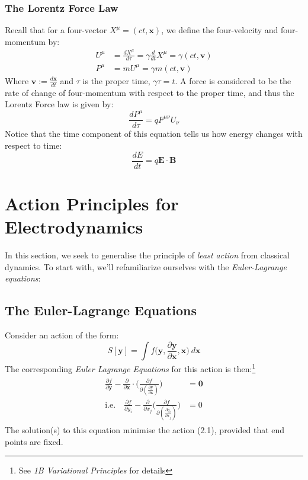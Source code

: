 \documentclass[a4paper]{article}
\numberwithin{equation}{section}
\begin{document}
\subsubsection{The Lorentz Force Law}
Recall that for a four-vector $X^\mu = (ct, \mathbf{x})$, we define the four-velocity and four-momentum by:
\begin{align}
U^\mu&=\frac{dX^\mu}{d \tau}=\gamma\frac{d}{dt}X^\mu=\gamma(ct,\mathbf{v}) \\
P^\mu &= mU^\mu = \gamma m (ct, \mathbf{v})
\end{align}
Where $\mathbf{v}:=\frac{d \mathbf{x}}{dt}$ and $\tau$ is the proper time, $\gamma \tau = t$. A force is considered to be the rate of change of four-momentum with respect to the proper time, and thus the Lorentz Force law is given by:
\begin{equation}
\frac{d P^\mu}{d \tau}=qF^{\mu \nu}U_\nu
\end{equation}
Notice that the time component of this equation tells us how energy changes with respect to time:
\begin{equation}
\frac{d E}{d t}=q \mathbf{E} \cdot \mathbf{B}
\end{equation}

\section{Action Principles for Electrodynamics}
In this section, we seek to generalise the principle of \textit{least action} from classical dynamics. To start with, we'll refamiliarize ourselves with the \textit{Euler-Lagrange equations}:
\subsection{The Euler-Lagrange Equations}
Consider an action of the form:
\begin{equation}
S[\mathbf{y}] = \int f\bigg(\mathbf{y},\frac{\partial \mathbf{y}}{\partial \mathbf{x}},\mathbf{x}\bigg) \ d \mathbf{x}
\end{equation}
The corresponding \textit{Euler Lagrange Equations} for this action is then:\footnote{See \textit{1B Variational Principles} for details}
\begin{align}
\begin{split}
\frac{\partial f}{\partial \mathbf{y}} - \frac{\partial}{
\partial \mathbf{x}} \cdot \bigg(\frac{\partial f}{\partial (\frac{\partial \mathbf{y}}{\partial \mathbf{x}})} \bigg)&=\mathbf{0} \\
\text{i.e.} \quad \frac{\partial f}{\partial y_i}-\frac{\partial}{\partial x_j}\bigg(\frac{\partial f}{\partial(\frac{\partial y_i}{\partial x_j})}\bigg)&=0
\end{split}
\end{align}
The solution(s) to this equation minimise the action (2.1), provided that end points are fixed.
\end{document}
